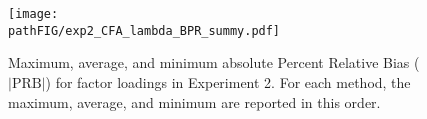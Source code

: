 \begin{figure}
	\texttt{[image: \\pathFIG/exp2\_CFA\_lambda\_BPR\_summy.pdf]}
	\caption{
		Maximum, average, and minimum absolute Percent Relative Bias ($|\text{PRB}|$) for factor loadings
		in Experiment 2.
		For each method, the maximum, average, and minimum are reported in this order.	
		}
\label{fig:exp2fl14}
\end{figure}

\FloatBarrier %

